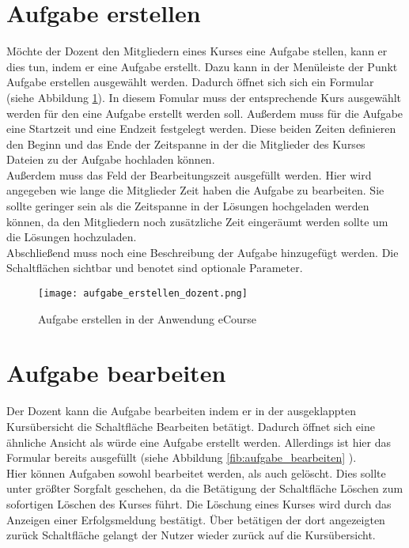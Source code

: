 \section{Aufgabe erstellen}
Möchte der Dozent den Mitgliedern eines Kurses eine Aufgabe stellen, kann er dies tun, indem er eine Aufgabe erstellt. Dazu kann in der Menüleiste der Punkt \glqq Aufgabe erstellen\grqq\; ausgewählt werden. Dadurch öffnet sich sich ein Formular (siehe Abbildung \ref{fib:aufgabe_anlegen}). 
In diesem Fomular muss der entsprechende Kurs ausgewählt werden für den eine Aufgabe erstellt werden soll. Außerdem muss für die Aufgabe eine Startzeit und eine Endzeit festgelegt werden. Diese beiden Zeiten definieren den Beginn und das Ende der Zeitspanne in der die Mitglieder des Kurses Dateien zu der Aufgabe hochladen können. \\
Außerdem muss das Feld der Bearbeitungszeit ausgefüllt werden. Hier wird angegeben wie lange die Mitglieder Zeit haben die Aufgabe zu bearbeiten. Sie sollte geringer sein als die Zeitspanne in der Lösungen hochgeladen werden können, da den Mitgliedern noch zusätzliche Zeit eingeräumt werden sollte um die Lösungen hochzuladen. \\
Abschließend muss noch eine Beschreibung der Aufgabe hinzugefügt werden. 
Die Schaltflächen \glqq sichtbar\grqq{} und \glqq benotet\grqq{} sind optionale Parameter.

\begin{figure}[h]
\centering
\texttt{[image: aufgabe\_erstellen\_dozent.png]}
\caption{Aufgabe erstellen in der Anwendung eCourse}
\label{fib:aufgabe_anlegen}
\end{figure}


\section{Aufgabe bearbeiten}
\label{sec:bearbeiten}
Der Dozent kann die Aufgabe bearbeiten indem er in der ausgeklappten Kursübersicht die Schaltfläche \glqq Bearbeiten\grqq{} betätigt. Dadurch öffnet sich eine ähnliche Ansicht als würde eine Aufgabe erstellt werden. Allerdings ist hier das Formular bereits ausgefüllt (siehe Abbildung \ref{fib:aufgabe_bearbeiten} ).\\
Hier können Aufgaben sowohl bearbeitet werden, als auch gelöscht. 
Dies sollte unter größter Sorgfalt geschehen, da die Betätigung der Schaltfläche \glqq Löschen\grqq{} zum sofortigen Löschen des Kurses führt. Die Löschung eines Kurses wird durch das Anzeigen einer Erfolgsmeldung bestätigt. Über betätigen der dort angezeigten \glqq zurück\grqq{} Schaltfläche gelangt der Nutzer wieder zurück auf die Kursübersicht.

